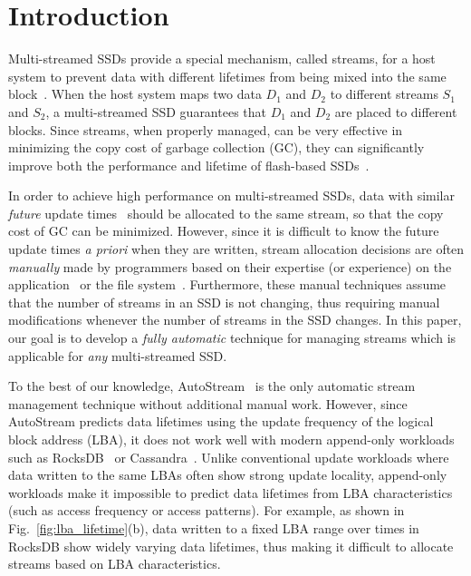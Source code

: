 \vspace{-10pt}
\section{Introduction}
\label{sec:intro}
\vspace{-5pt}
Multi-streamed SSDs provide a special mechanism,
called streams, for a host system to prevent data with different lifetimes 
from being mixed into the same block~\cite{T10, MultiStream}.
When the host system maps two data $D_1$ and $D_2$ to 
different streams $S_1$ and $S_2$, a multi-streamed SSD guarantees that 
$D_1$ and $D_2$ are placed to different blocks.   
Since streams, when properly managed, can be very effective in minimizing 
the copy cost of garbage collection (GC), they
can significantly improve both the performance and lifetime of 
flash-based SSDs~\cite{MultiStream, Level, FStream, AutoStream}.

In order to achieve high performance on multi-streamed SSDs, data with similar 
{\it future} update times~\cite{PCHa}
should be allocated 
to the same stream, so that the copy cost of GC can be minimized.
However, since it is difficult to know the future update times {\it a priori} when they are written,
stream allocation decisions are often {\it manually} made 
by programmers based on their expertise (or experience) 
on the application~\cite{MultiStream, Level} or the file system~\cite{FStream}.  
Furthermore, these manual techniques assume 
that the number of streams in an SSD is not changing, 
thus requiring manual modifications whenever the number of streams in the SSD changes.
In this paper, our goal is to develop 
a {\it fully automatic} technique for managing streams 
which is applicable for {\it any} multi-streamed SSD.

To the best of our knowledge, AutoStream~\cite{AutoStream} is the only automatic 
stream management technique
without additional manual work.  
However, since AutoStream predicts data lifetimes using the update frequency 
of the logical block address (LBA), it does not work well with modern append-only workloads 
such as RocksDB~\cite{RocksDB} or Cassandra~\cite{Cassandra}.  
Unlike conventional update workloads where data written to the same LBAs 
often show strong update locality, 
append-only workloads make it impossible to predict data lifetimes 
from LBA characteristics (such as access frequency or access patterns).  
For example, as shown in Fig.~\ref{fig:lba_lifetime}(b), 
data written to a fixed LBA range over times in RocksDB 
show widely varying data lifetimes, 
thus making it difficult to allocate streams based on LBA characteristics.


